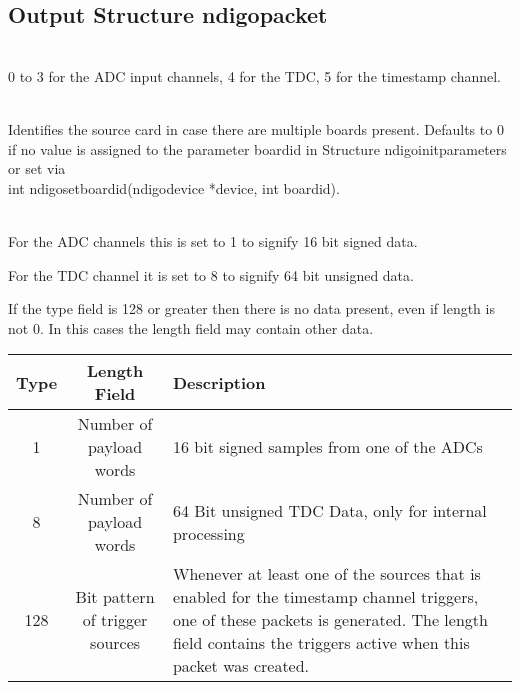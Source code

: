\subsection{Output Structure ndigo\tu packet}

	\\
	0 to 3 for the ADC input channels, 4 for the TDC, 5 for the timestamp channel.\par
	
	\\
	Identifies the source card in case there are multiple boards present. Defaults to 0 if no value is assigned to the parameter \textsf{board\tu id} in Structure \textsf{ndigo\tu init\tu parameters} or set via\\ \textsf{int ndigo\tu set\tu board\tu id(ndigo\tu device *device, int board\tu id)}.\par

	\\
	For the ADC channels this is set to 1 to signify 16 bit signed data.\par

	For the TDC channel it is set to 8 to signify 64 bit unsigned data.\par

	If the type field is 128 or greater then there is no data present, even if length is not 0. In this cases the length field may contain other data.\par
	
	\noindent
	\begin{small}
	\begin{tabular}{|c|c|p{}|}
		\hline
		Type & Length Field & Description\\\hline
		\hline
		1 & Number of payload words & 16 bit signed samples from one of the ADCs\\\hline
		8 & Number of payload words & 64 Bit unsigned TDC Data, only for internal processing\\\hline
		128 & Bit pattern of trigger sources & Whenever at least one of the sources that is enabled for the timestamp channel triggers, one of these packets is generated. The length field contains the triggers active when this packet was created.\\\hline
	\end{tabular}
	\end{small}

